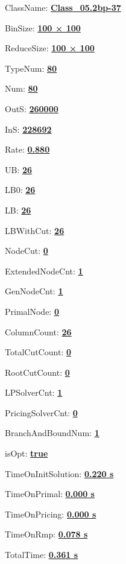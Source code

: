 \documentclass[11pt]{article}
\begin{document}
\pagestyle{empty}


ClassName: \underline{\textbf{Class_05.2bp-37}}
\par
BinSize: \underline{\textbf{100 × 100}}
\par
ReduceSize: \underline{\textbf{100 × 100}}
\par
TypeNum: \underline{\textbf{80}}
\par
Num: \underline{\textbf{80}}
\par
OutS: \underline{\textbf{260000}}
\par
InS: \underline{\textbf{228692}}
\par
Rate: \underline{\textbf{0.880}}
\par
UB: \underline{\textbf{26}}
\par
LB0: \underline{\textbf{26}}
\par
LB: \underline{\textbf{26}}
\par
LBWithCut: \underline{\textbf{26}}
\par
NodeCut: \underline{\textbf{0}}
\par
ExtendedNodeCnt: \underline{\textbf{1}}
\par
GenNodeCnt: \underline{\textbf{1}}
\par
PrimalNode: \underline{\textbf{0}}
\par
ColumnCount: \underline{\textbf{26}}
\par
TotalCutCount: \underline{\textbf{0}}
\par
RootCutCount: \underline{\textbf{0}}
\par
LPSolverCnt: \underline{\textbf{1}}
\par
PricingSolverCnt: \underline{\textbf{0}}
\par
BranchAndBoundNum: \underline{\textbf{1}}
\par
isOpt: \underline{\textbf{true}}
\par
TimeOnInitSolution: \underline{\textbf{0.220 s}}
\par
TimeOnPrimal: \underline{\textbf{0.000 s}}
\par
TimeOnPricing: \underline{\textbf{0.000 s}}
\par
TimeOnRmp: \underline{\textbf{0.078 s}}
\par
TotalTime: \underline{\textbf{0.361 s}}
\par
\newpage


\end{document}
